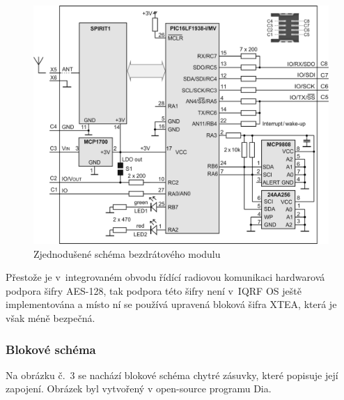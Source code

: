 \documentclass[12pt,a4paper,oneside]{article}
\begin{document}
\begin{figure}[H]
\centering
\label{fig:iqrf/zjednodusene-schema}
\includegraphics[width = 128mm]{img/iqrf/dctr-72dat-zjednodusene-schema.png}
\caption{Zjednodušené schéma bezdrátového modulu}
\end{figure}

Přestože je v~integrovaném obvodu řídící radiovou komunikaci hardwarová podpora šifry AES-128, tak podpora této šifry není v~IQRF OS ještě implementována a místo ní se používá upravená bloková šifra XTEA, která je však méně bezpečná.

\newpage

\subsubsection{Blokové schéma}

Na obrázku č.~3 se nachází blokové schéma chytré zásuvky, které popisuje její zapojení. Obrázek byl vytvořený v open-source programu Dia\cite{sw/dia}.
\end{document}
